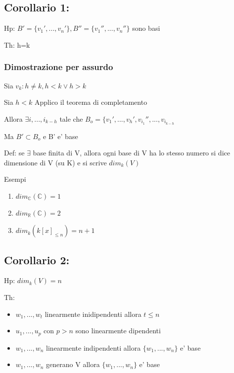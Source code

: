 \documentclass{article}
\begin{document}
\subsection*{Corollario 1:}
\begin{flushleft}
	Hp: $B' = \{ v_1',...,v_n' \},B'' = \{ v_1'',...,v_n'' \}$ sono basi
\end{flushleft}
\begin{flushleft}
	Th: h=k
\end{flushleft}
\subsubsection*{Dimostrazione per assurdo}
Sia $v_k : h\neq k, h<k \lor h>k$
\begin{flushleft}
	Sia $h<k$ Applico il teorema di completamento
\end{flushleft}
\begin{flushleft}
	Allora $\exists i,...,i_{k-h}$ tale che $B_o = \{ v_1',...,v_h',v_{i_1}'',...,v_{i_{k-h}}$
\end{flushleft}
\begin{flushleft}
	Ma $B' \subset B_o$ e B' e' base
\end{flushleft}
\begin{flushleft}
	Def: se $\exists$ base finita di V, allora ogni base di V ha lo stesso numero si dice dimensione di V (su K) e si scrive $dim_k(V)$
\end{flushleft}
Esempi
\begin{enumerate}
	\item $dim_{\mathbb{C}}(\mathbb{C})=1$
	\item $dim_{\mathbb{R}}(\mathbb{C})=2$
	\item $dim_k(k[x]_{\leq n})=n+1$
\end{enumerate}
\subsection*{Corollario 2:}
\begin{flushleft}
	Hp: $dim_k(V)=n$
\end{flushleft}
Th:
\begin{itemize}
	\item $w_1,...,w_t$ linearmente inidipendenti allora $t \leq n$
	\item $u_1,...,u_p$ con $p>n$ sono linearmente dipendenti
	\item $w_1,...,w_n$ linearmente indipendenti allora $\{w_1,...,w_n \}$ e' base
	\item $w_1,...,w_n$ generano V allora $\{w_1,...,w_n \}$ e' base
\end{itemize}
\end{document}
